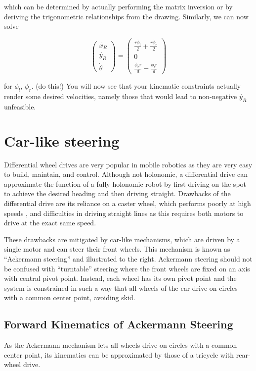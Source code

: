 which can be determined by actually performing the matrix inversion or by deriving the trigonometric relationships from the drawing.  Similarly, we can now solve

\begin{equation}
\left(\begin{array}{c} \dot{x_R}\\\dot{y_R}\\\dot{\theta}\end{array}\right)=\left(\begin{array}{c}\frac{r\dot{\phi_l}}{2}+\frac{r\dot{\phi_r}}{2}\\0\\\frac{\dot{\phi_r} r}{d}-\frac{\dot{\phi_l} r}{d}\end{array}\right)
\end{equation}

for $ \phi_l$, $ \phi_r$. (do this!) You will now see that your kinematic constraints actually render some desired velocities, namely those that would lead to non-negative $ \dot{y_R}$ unfeasible.


\section{Car-like steering}
Differential wheel drives are very popular in mobile robotics as they are very easy to build, maintain, and control. Although not holonomic, a differential drive can approximate the function of a fully holonomic robot by first driving on the spot to achieve the desired heading and then driving straight. Drawbacks of the differential drive are its reliance on a caster wheel, which performs poorly at high speeds , and difficulties in driving straight lines as this requires both motors to drive at the exact same speed.


These drawbacks are mitigated by car-like mechanisms, which are driven by a single motor and can steer their front wheels. This mechanism is known as ``Ackermann steering''  and illustrated to the right. Ackermann steering should not be confused with ``turntable'' steering  where the front wheels are fixed on an axis with central pivot point. Instead, each wheel has its own pivot point and the system is constrained in such a way that all wheels of the car drive on circles with a common center point, avoiding skid.

\subsection{Forward Kinematics of Ackermann Steering}
As the Ackermann mechanism lets all wheels drive on circles with a common center point, its kinematics can be approximated by those of a tricycle with rear-wheel drive.


